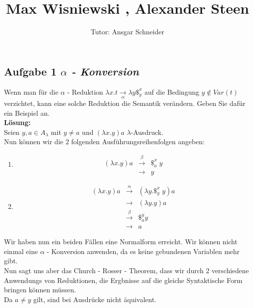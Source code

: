 \documentclass[11pt,a4paper,ngerman]{article}
\author{Tutor: Ansgar Schneider}
\date{}
\title{Max Wisniewski , Alexander Steen}
\begin{document}
   
\maketitle
\thispagestyle{fancy}
\newcommand{\A}{\mathbb{A}}

\subsection*{Aufgabe 1 \mdseries\itshape $\alpha$ - Konversion}
Wenn man für die $\alpha$ - Reduktion $\lambda x.t \underset{\alpha}{\rightarrow} \lambda y \$_y^x $ auf
die Bedingung $y \not\in Var(t)$ verzichtet, kann eine solche Reduktion die Semantik verändern. Geben Sie
dafür ein Beispiel an.\\

\textbf{Lösung:}\\
   Seien $y,a \in A_\lambda$ mit $y \not= a$ und $(\lambda x.y)a$ $\lambda$-Ausdruck.\\
   Nun können wir die 2 folgenden Ausführungsreihenfolgen angeben:
   \begin{enumerate}[1:]
      \item $$\begin{array}{rcl}
         (\lambda x.y)a & \overset{\beta}{\longrightarrow}& \$_a^x \; y\\
            &\longrightarrow& y
         \end{array}$$
      \item $$\begin{array}{rcl}
            (\lambda x.y)a &\overset{\alpha}{\longrightarrow}& (\lambda y.\$_y^x \; y)a\\
               &\longrightarrow& (\lambda y.y)a\\
               &\overset{\beta}{\longrightarrow}& \$_a^y y\\
               &\longrightarrow& a
         \end{array}$$ 
   \end{enumerate}
   Wir haben nun ein beiden Fällen eine Normalform erreicht. Wir können nicht einmal eine
   $\alpha$ - Konversion anwenden, da es keine gebundenen Variablen mehr gibt.\\
   Nun sagt uns aber das Church - Rosser - Theorem, dass wir durch 2 verschiedene Anwendungs von
   Reduktionen, die Ergbnisse auf die gleiche Syntaktische Form bringen können müssen.\\
   Da $a \not= y$ gilt, sind bei Ausdrücke nicht äquivalent.
   
\end{document}
